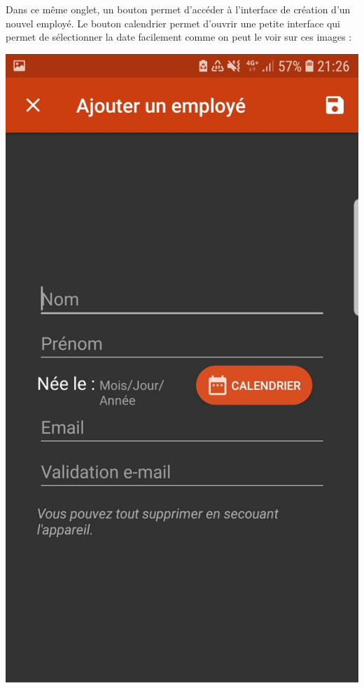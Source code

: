 \documentclass{article}
\begin{document}
Dans ce même onglet, un bouton permet d'accéder à l'interface de création d'un nouvel employé. Le bouton calendrier permet d'ouvrir une petite interface qui permet de sélectionner la date facilement comme on peut le voir sur ces images :
\begin{center}
    \includegraphics[scale=0.1]{ajoutE.jpg}

\end{center}
\end{document}
